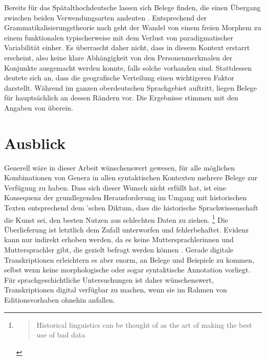 Bereits für das Spätalthochdeutsche lassen sich Belege
finden, die einen Übergang zwischen beiden Verwendungsarten
andeuten \autocite[vgl.\ die Beispiele in][627]{ksw2}. Entsprechend der
Grammatikalisierungstheorie nach \citet[146--150]{lehmann2015} geht der Wandel
von einem freien Morphem zu einem funktionalen typischerweise mit dem Verlust
von paradigmatischer Variabilität einher. Es überrascht daher nicht, dass
 in diesem Kontext erstarrt erscheint, also keine klare
Abhängigkeit von den Personenmerkmalen der Konjunkte ausgemacht werden konnte,
falls solche vorhanden sind. Stattdessen deutete sich an, dass die
geografische Verteilung einen wichtigeren Faktor darstellt.
Während  im ganzen oberdeutschen Sprachgebiet
auftritt, liegen Belege für  hauptsächlich an dessen Rändern vor.
Die Ergebnisse stimmen mit den Angaben von \citet[627--628]{ksw2} überein.

\section{Ausblick}

Generell wäre in dieser Arbeit wünschenswert gewesen, für alle möglichen
Kombinationen von Genera in allen syntaktischen Kontexten mehrere Belege zur
Verfügung zu haben. Dass sich dieser Wunsch nicht erfüllt hat, ist eine
Konsequenz der grundlegenden Herausforderung im Umgang mit historischen Texten
entsprechend dem \citeauthor{labov1994}'schen Diktum, dass die historische
Sprachwissenschaft die Kunst sei, den besten Nutzen aus schlechten Daten zu
ziehen.%
%
	\footnote{\foreignblockcquote{english}[11]{labov1994}{Historical
		linguistics can \textelp{} be thought of as the art of making the best
		use of bad data}.%
	}
%
Die Überlieferung ist letztlich dem Zufall unterworfen und fehlerbehaftet.
Evidenz kann nur indirekt erhoben werden, da es keine Muttersprachlerinnen und
Muttersprachler gibt, die gezielt befragt werden können
\autocite[11]{labov1994}. Gerade digitale Transkriptionen erleichtern es aber
enorm, an Belege und Beispiele zu kommen, selbst wenn keine morphologische oder
sogar syntaktische Annotation vorliegt.
Für sprachgeschichtliche Untersuchungen ist daher wünschenswert,
Transkriptionen digital verfügbar zu machen, wenn sie im Rahmen von
Editionsvorhaben ohnehin anfallen.


